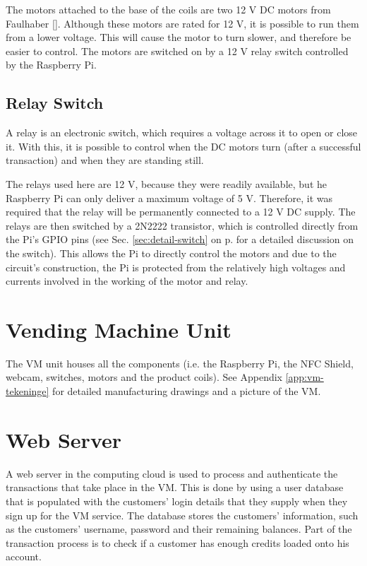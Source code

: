 The motors attached to the base of the coils are two 12 V DC motors from Faulhaber
[\cite{manual:dc-motors}]. Although these motors are rated for 12 V, it is possible to run them
from a lower voltage. This will cause the motor to turn slower, and therefore be easier to
control. The motors are switched on by a 12 V relay switch controlled by the Raspberry Pi.

\subsection{Relay Switch}
\label{sec:relay-switch}

A relay is an electronic switch, which requires a voltage across it to open or close it.
With this, it is possible to control when the DC motors turn (after a successful
transaction) and when they are standing still.

The relays used here are 12 V, because they were readily available, but he Raspberry 
Pi can only deliver a maximum voltage of 5 V. Therefore, it was required that the
relay will be permanently connected to a 12 V DC supply. The relays are then switched by a
2N2222 transistor, which is controlled directly from the Pi's GPIO pins (see Sec.
\ref{sec:detail-switch} on p.\pageref{sec:detail-switch} for a detailed discussion on the
switch). This allows the Pi to directly control the motors and due to the circuit's
construction, the Pi is protected from the relatively high voltages and currents involved
in the working of the motor and relay.

\section{Vending Machine Unit}

The VM unit houses all the components (i.e. the Raspberry Pi, the NFC Shield,
webcam, switches, motors and the product coils). See Appendix \ref{app:vm-tekeninge} 
for detailed manufacturing drawings and a picture of the VM.

\section{Web Server}

A web server in the computing cloud is used to process and authenticate the
transactions that take place in the VM. This is done by
using a user database that is populated with the customers' login details that
they supply when they sign up for the VM service. The database
stores the customers' information, such as the customers' username, password and their
remaining balances. Part of the transaction process is to check if a customer has enough
credits loaded onto his account.

